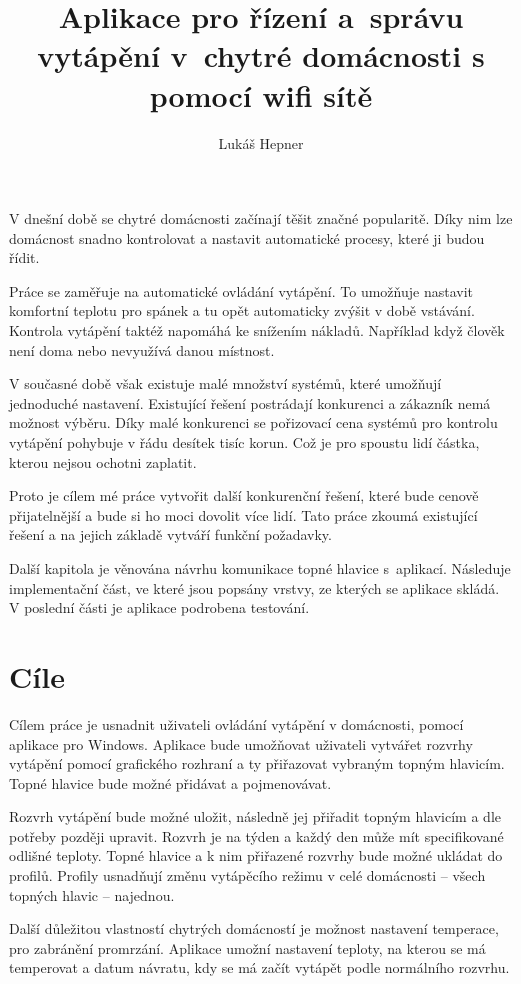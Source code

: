 \documentclass[thesis=B,czech]{FITthesis}[2012/10/20]
\title{Aplikace pro řízení a~správu vytápění v~chytré domácnosti s pomocí wifi sítě}
\author{Lukáš Hepner} %
\begin{document}
\begin{introduction}
V dnešní době se chytré domácnosti začínají těšit značné popularitě. Díky nim lze domácnost snadno kontrolovat a nastavit automatické procesy, které ji budou řídit.

Práce se zaměřuje na automatické ovládání vytápění. To umožňuje nastavit komfortní teplotu pro spánek a tu opět automaticky zvýšit v době vstávání.
Kontrola vytápění taktéž napomáhá ke snížením nákladů. Například když člověk není doma nebo nevyužívá danou místnost.

V současné době však existuje malé množství systémů, které umožňují jednoduché nastavení. Existující řešení postrádají konkurenci a zákazník nemá možnost výběru.
Díky malé konkurenci se pořizovací cena systémů pro kontrolu vytápění pohybuje v řádu desítek tisíc korun. Což je pro spoustu lidí částka, kterou nejsou ochotni zaplatit.

Proto je cílem mé práce vytvořit další konkurenční řešení, které bude cenově přijatelnější a bude si ho moci dovolit více lidí. Tato práce zkoumá existující řešení a na jejich základě vytváří funkční požadavky. 

Další kapitola je věnována návrhu komunikace topné hlavice s~aplikací. Následuje implementační část, ve které jsou popsány vrstvy, ze kterých se aplikace skládá. V poslední části je aplikace podrobena testování.



\end{introduction}

\chapter{Cíle}
Cílem práce je usnadnit uživateli ovládání vytápění v domácnosti, pomocí aplikace pro Windows. Aplikace bude umožňovat uživateli vytvářet rozvrhy vytápění pomocí grafického rozhraní a ty přiřazovat vybraným topným hlavicím. Topné hlavice bude možné přidávat a pojmenovávat.

Rozvrh vytápění bude možné uložit, následně jej přiřadit topným hlavicím a dle potřeby později upravit. Rozvrh je na týden a každý den může mít specifikované odlišné teploty. Topné hlavice a k nim přiřazené rozvrhy bude možné ukládat do profilů. Profily usnadňují změnu vytápěcího režimu v celé domácnosti -- všech topných hlavic -- najednou.

Další důležitou vlastností chytrých domácností je možnost nastavení temperace, pro zabránění promrzání. Aplikace umožní nastavení teploty, na kterou se má temperovat a datum návratu, kdy se má začít vytápět podle normálního rozvrhu.
\end{document}
